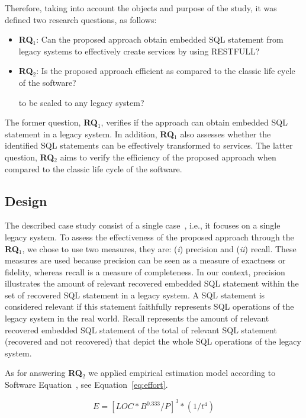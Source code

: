 \documentclass[a4paper,twoside]{article}
\begin{document}
Therefore, taking into account the objects and purpose of the study, it was defined two research questions, as follows: 

\begin{itemize}
	\item \textbf{RQ$_1$}: Can the proposed approach obtain embedded SQL statement from legacy systems to effectively create services by using RESTFULL?
	\item \textbf{RQ$_2$}: Is the proposed approach efficient as compared to the classic life cycle of the software? 

	to be scaled to any legacy system?
\end{itemize}

The former question, \textbf{RQ$_1$}, verifies if the approach can obtain embedded SQL statement in a legacy system. In addition, \textbf{RQ$_1$} also assesses whether the identified SQL statements can be effectively transformed to services. The latter question, \textbf{RQ$_2$} aims to verify the efficiency of the proposed approach when compared to the classic life cycle of the software.

\subsection{Design} %
\label{sub:design_case_study}

The described case study consist of a single case~\cite{citeulike:598898}, i.e., it focuses on a single legacy system. To assess the effectiveness of the proposed approach through the \textbf{RQ$_1$}, we chose to use two measures, they are: (\textit{i}) precision and (\textit{ii}) recall. These measures are used because precision can be seen as a measure of exactness or fidelity, whereas recall is a measure of completeness. In our context, precision illustrates the amount of relevant recovered embedded SQL statement within the set of recovered SQL statement in a legacy system. A SQL statement is considered relevant if this statement faithfully represents SQL operations of the legacy system in the real world. Recall represents the amount of relevant recovered embedded SQL statement of the total of relevant SQL statement (recovered and not recovered) that depict the whole SQL operations of the legacy system.

As for answering \textbf{RQ$_2$} we applied empirical estimation model according to Software Equation~\cite{Putnam:1991:MER:574087}, see Equation~\ref{eq:effort}. 

\begin{equation}
  E = [LOC * B^{0.333}/P]^3 * (1/t^4)
  \label{eq:effort}
\end{equation}
\end{document}
